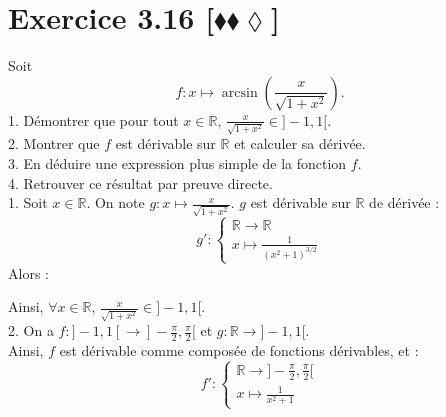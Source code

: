 \documentclass[10pt]{article}
\begin{document}

\section*{Exercice 3.16 [$\blacklozenge\blacklozenge\lozenge$]}
\begin{tcolorbox}[enhanced, width=6in, center, size=fbox, fontupper=\large, drop shadow southwest]
    Soit
    \begin{equation*}
        f:x\mapsto\arcsin\left(\frac{x}{\sqrt{1+x^2}}\right).
    \end{equation*}
    1. Démontrer que pour tout $x\in\mathbb{R}$, $\frac{x}{\sqrt{1+x^2}}\in]-1,1[$.\\
    2. Montrer que $f$ est dérivable sur $\mathbb{R}$ et calculer sa dérivée.\\
    3. En déduire une expression plus simple de la fonction $f$.\\
    4. Retrouver ce résultat par preuve directe.\\[0.25cm]
    1. Soit $x\in\mathbb{R}$. On note $g:x\mapsto\frac{x}{\sqrt{1+x^2}}$. $g$ est dérivable sur $\mathbb{R}$ de dérivée :
    \begin{equation*}
        g':\begin{cases}\mathbb{R}\rightarrow\mathbb{R}\\x\mapsto\frac{1}{(x^2+1)^{3/2}}\end{cases}
    \end{equation*}
    Alors : 
    \begin{center}
    \end{center}
    Ainsi, $\forall{x\in\mathbb{R}}$, $\frac{x}{\sqrt{1+x^2}}\in]-1,1[$.\\[0.25cm]
    2. On a $f:]-1,1[\rightarrow]-\frac{\pi}{2},\frac{\pi}{2}[$ et $g:\mathbb{R}\rightarrow]-1,1[$.\\
    Ainsi, $f$ est dérivable comme composée de fonctions dérivables, et :
    \begin{equation*}
        f':\begin{cases}\mathbb{R}\rightarrow]-\frac{\pi}{2}, \frac{\pi}{2}[\\x\mapsto\frac{1}{x^2+1}\end{cases}

\end{equation*}
\end{tcolorbox}
\end{document}
